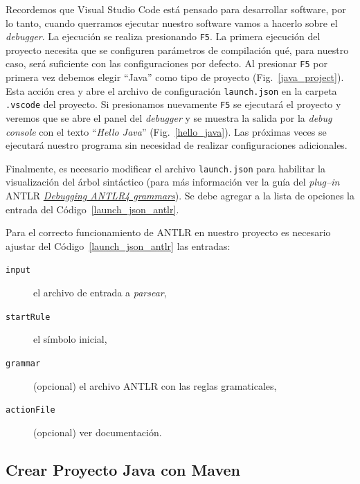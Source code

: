 \documentclass[a5paper,10pt]{article}
\begin{document}
Recordemos que Visual Studio Code está pensado para desarrollar software, por lo tanto, cuando querramos ejecutar nuestro software vamos a hacerlo sobre el \emph{debugger}.  La ejecución se realiza presionando \verb|F5|.  La primera ejecución del proyecto necesita que se configuren parámetros de compilación qué, para nuestro caso, será suficiente con las configuraciones por defecto.  Al presionar \verb|F5| por primera vez debemos elegir ``Java'' como tipo de proyecto  (Fig.~\ref{java_project}).  Esta acción crea y abre el archivo de configuración \verb|launch.json| en la carpeta \verb|.vscode| del proyecto.  Si presionamos nuevamente \verb|F5| se ejecutará el proyecto y veremos que se abre el panel del \emph{debugger} y se muestra la salida por la \emph{debug console} con el texto ``\emph{Hello Java}'' (Fig.~\ref{hello_java}).  Las próximas veces se ejecutará nuestro programa sin necesidad de realizar configuraciones adicionales.

Finalmente, es necesario modificar el archivo \verb|launch.json| para habilitar la visualización del árbol sintáctico (para más información ver la guía del \emph{plug--in} ANTLR \href{https://github.com/mike-lischke/vscode-antlr4/blob/master/doc/grammar-debugging.md}{\emph{Debugging ANTLR4 grammars}}).  Se debe agregar a la lista de opciones la entrada del Código~\ref{launch_json_antlr}.



Para el correcto funcionamiento de ANTLR en nuestro proyecto es necesario ajustar del Código~\ref{launch_json_antlr} las entradas:
\begin{description}
	\item[\texttt{input}] el archivo de entrada a \emph{parsear},
	\item[\texttt{startRule}] el símbolo inicial,
	\item[\texttt{grammar}] (opcional) el archivo ANTLR con las reglas gramaticales,
	\item[\texttt{actionFile}] (opcional) ver documentación.
\end{description}

\subsection{Crear Proyecto Java con Maven}
\label{proyecto_maven}
\end{document}
